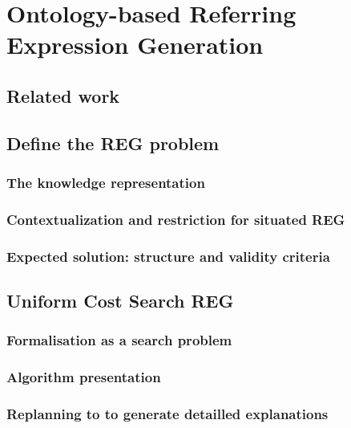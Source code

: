 \ifdefined{}
\else
\setcounter{chapter}{4} %
\dominitoc
\faketableofcontents
\fi

\chapter{Ontology-based Referring Expression Generation}
\minitoc

\section{Related work}

\section{Define the REG problem}

\subsection{The knowledge representation}

\subsection{Contextualization and restriction for situated REG}

\subsection{Expected solution: structure and validity criteria}

\section{Uniform Cost Search REG}

\subsection{Formalisation as a search problem}

\subsection{Algorithm presentation}

\subsection{Replanning to to generate detailled explanations}

